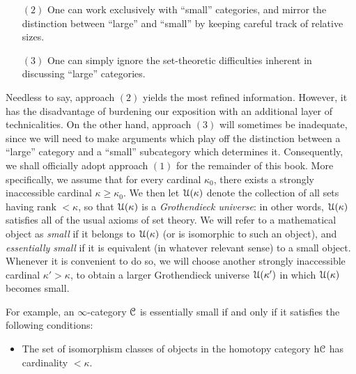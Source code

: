 \begin{Didn't Read}
\begin{itemize}
\begin{itemize}
\item Working in an axiomatic framework which allows both sets and
{\it classes} (collections of sets which are possibly too large to
themselves be considered sets).

\item Working in a standard set-theoretic framework (such as
Zermelo-Frankel), but incorporating a theory of classes through
some ad-hoc device. For example, one can define a class to be a
collection of sets which is defined by some formula in the
language of set theory.
\end{itemize}

\item[$(2)$] One can work exclusively with ``small'' categories, and
mirror the distinction between ``large'' and ``small'' by keeping
careful track of relative sizes.

 \item[$(3)$] One can simply ignore the set-theoretic difficulties
 inherent in discussing ``large'' categories.

\end{itemize}

Needless to say, approach $(2)$ yields the most refined information. However, it has the disadvantage of burdening our exposition with an additional layer of technicalities. On the other hand, approach $(3)$ will sometimes be inadequate, since we will need to make arguments which play off the distinction between a ``large'' category and a ``small'' subcategory which determines it. Consequently, we shall officially adopt approach $(1)$ for the remainder of this book. More specifically, we assume that for every
cardinal $\kappa_0$, there exists a strongly inaccessible cardinal $\kappa \geq \kappa_0$.
We then let $\operatorname{\mathcal{U}}(\kappa)$ denote the collection of all sets having rank $< \kappa$, so that
$\operatorname{\mathcal{U}}(\kappa)$ is a {\it Grothendieck universe}: in other words, $\operatorname{\mathcal{U}}(\kappa)$ satisfies all of the usual axioms of set theory. We will refer to a mathematical object as {\it small} if it belongs to $\operatorname{\mathcal{U}}(\kappa)$ (or is isomorphic to such an object), and {\it essentially small} if it is equivalent (in whatever relevant sense) to a small object. Whenever it is convenient to do so, we will choose another strongly inaccessible cardinal $\kappa' > \kappa$, to obtain a larger Grothendieck universe
$\operatorname{\mathcal{U}}(\kappa')$ in which $\operatorname{\mathcal{U}}(\kappa)$ becomes small.

For example, an $\infty$-category $\operatorname{\mathcal{C}}$ is essentially small if and only if it satisfies the following conditions:
\begin{itemize}
\item The set of isomorphism classes of objects in the homotopy
category $\rm{h} \it{\operatorname{\mathcal{C}}}$ has cardinality $< \kappa$.


\end{itemize}
\end{Didn't Read}
